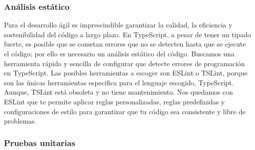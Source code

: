 \subsubsection{Análisis estático}
Para el desarrollo ágil es imprescindible garantizar la calidad, la eficiencia y sostenibilidad del código a largo plazo.
En TypeScript, a pesar de tener un tipado fuerte, es posible que se cometan errores que no se detecten hasta que se ejecute el código; por ello es necesario un análisis estático del código.
Buscamos una herramienta rápida y sencilla de configurar que detecte errores de programación en TypeScript.
Las posibles herramientas a escoger son ESLint o TSLint, porque son las únicas herramientas especifica para el lenguaje escogido, TypeScript. Aunque, TSLint está obsoleta y no tiene mantenimiento.
Nos quedamos con ESLint que te permite aplicar reglas personalizadas, reglas predefinidas y configuraciones de estilo para garantizar que tu código sea consistente y libre de problemas.

\subsubsection{Pruebas unitarias}
